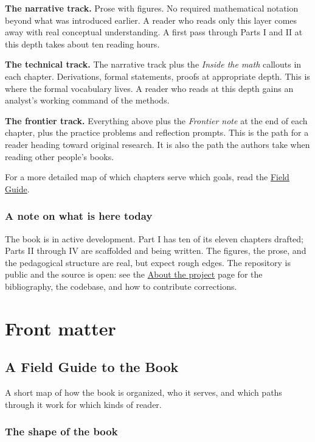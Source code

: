 \documentclass[
  letterpaper,
  11pt,
  twoside,
  openany]{scrbook}
\begin{document}
\textbf{The narrative track.} Prose with figures. No required
mathematical notation beyond what was introduced earlier. A reader who
reads only this layer comes away with real conceptual understanding. A
first pass through Parts I and II at this depth takes about ten reading
hours.

\textbf{The technical track.} The narrative track plus the \emph{Inside
the math} callouts in each chapter. Derivations, formal statements,
proofs at appropriate depth. This is where the formal vocabulary lives.
A reader who reads at this depth gains an analyst's working command of
the methods.

\textbf{The frontier track.} Everything above plus the \emph{Frontier
note} at the end of each chapter, plus the practice problems and
reflection prompts. This is the path for a reader heading toward
original research. It is also the path the authors take when reading
other people's books.

For a more detailed map of which chapters serve which goals, read the
\href{prose/front/field-guide.qmd}{Field Guide}.

\section{A note on what is here
today}\label{a-note-on-what-is-here-today}

The book is in active development. Part I has ten of its eleven chapters
drafted; Parts II through IV are scaffolded and being written. The
figures, the prose, and the pedagogical structure are real, but expect
rough edges. The repository is public and the source is open: see the
\href{prose/front/about.qmd}{About the project} page for the
bibliography, the codebase, and how to contribute corrections.

\part{Front matter}

\chapter{A Field Guide to the Book}\label{a-field-guide-to-the-book}

A short map of how the book is organized, who it serves, and which paths
through it work for which kinds of reader.

\section{The shape of the book}\label{the-shape-of-the-book}
\end{document}

